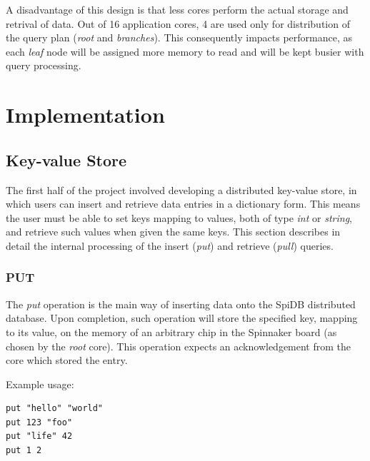 A disadvantage of this design is that less cores perform the actual storage and retrival of data. Out of 16 application cores, 4 are used only for distribution of the query plan (\textit{root} and \textit{branches}). This consequently impacts performance, as each \textit{leaf} node will be assigned more memory to read and will be kept busier with query processing.

\section{Implementation}
\label{sec:implementation}

\subsection{Key-value Store}
The first half of the project involved developing a distributed key-value store, in which users can insert and retrieve data entries in a dictionary form. This means the user must be able to set keys mapping to values, both of type \textit{int} or \textit{string}, and retrieve such values when given the same keys. This section describes in detail the internal processing of the insert (\textit{put}) and retrieve (\textit{pull}) queries. 

\subsubsection{PUT}
The \textit{put} operation is the main way of inserting data onto the SpiDB distributed database. 
Upon completion, such operation will store the specified key, mapping to its value, on the memory of an arbitrary chip in the Spinnaker board (as chosen by the \textit{root} core). This operation expects an acknowledgement from the core which stored the entry.

Example usage:
\begin{lstlisting}
put "hello" "world"
put 123 "foo"
put "life" 42
put 1 2
\end{lstlisting}
 
